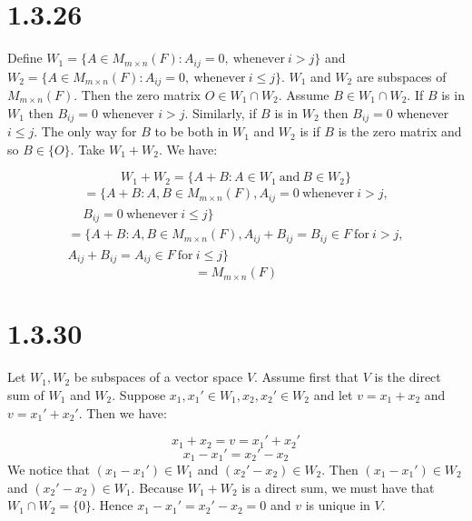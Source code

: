 \documentclass{article}
\begin{document}
\section*{1.3.26}

Define \(W_{1} = \{A \in M_{m \times n}(F): A_{ij} = 0, \ \mbox{whenever} \ i > j\}\) and
\(W_{2} = \{A \in M_{m \times n}(F): A_{ij} = 0, \ \mbox{whenever} \ i \leq j\}\).
\(W_{1}\) and \(W_{2}\) are subspaces of \(M_{m \times n}(F)\). Then the zero matrix \(O \in W_{1} \cap W_{2}\).
Assume \(B \in W_{1} \cap W_{2}\). If \(B\) is in \(W_{1}\) then \(B_{ij} = 0\) whenever \(i > j\).
Similarly, if \(B\) is in \(W_{2}\) then \(B_{ij} = 0\) whenever \(i \leq j\). The only way for
\(B\) to be both in \(W_{1}\) and \(W_{2}\) is if \(B\) is the zero matrix and so \(B \in \{O\}\).
Take \(W_{1} + W_{2}\). We have:

\begin{equation*}
    W_{1} + W_{2} = \{A + B: A \in W_{1} \ \mbox{and} \ B \in W_{2} \}
\end{equation*}
\begin{multline*}
    = \{ A + B:  A, B \in M_{m \times n}(F), A_{ij} = 0 \ \mbox{whenever} \ i > j, 
    \\ B_{ij} = 0 \ \mbox{whenever} \ i \leq j\}
\end{multline*}
\begin{multline*}
    = \{ A + B:  A, B \in M_{m \times n}(F), A_{ij} + B_{ij} = B_{ij} \in F \ \mbox{for} \ i > j, \\ A_{ij} + B_{ij} = A_{ij} \in F \ \mbox{for} \ i \leq j  \}
\end{multline*}
\begin{equation*}
    = M_{m \times n}(F)
\end{equation*}

\section*{1.3.30}

Let \(W_{1}, W_{2}\) be subspaces of a vector space \(V\). Assume first that \(V\) is the direct sum of \(W_{1}\) and \(W_{2}\).
Suppose \(x_{1}, x_{1}' \in W_{1}, x_{2}, x_{2}' \in W_{2}\) and let \(v = x_{1} + x_{2}\) and \(v = x_{1}' + x_{2}'\).
Then we have:

\begin{equation*}
    x_{1} + x_{2} = v = x_{1}' + x_{2}'
\end{equation*}
\begin{equation*}
    x_{1} - x_{1}' = x_{2}' - x_{2}
\end{equation*}
We notice that \((x_{1} - x_{1}') \in W_{1}\) and \( (x_{2}' - x_{2}) \in W_{2}\).
Then \((x_{1} - x_{1}') \in W_{2}\) and \((x_{2}' - x_{2}) \in W_{1}\).
Because \(W_{1} + W_{2}\) is a direct sum, we must have that \(W_{1} \cap W_{2} = \{0\}\).
Hence \(x_{1} - x_{1}' = x_{2}' - x_{2} = 0\) and \(v\) is unique in \(V\). 
\end{document}
